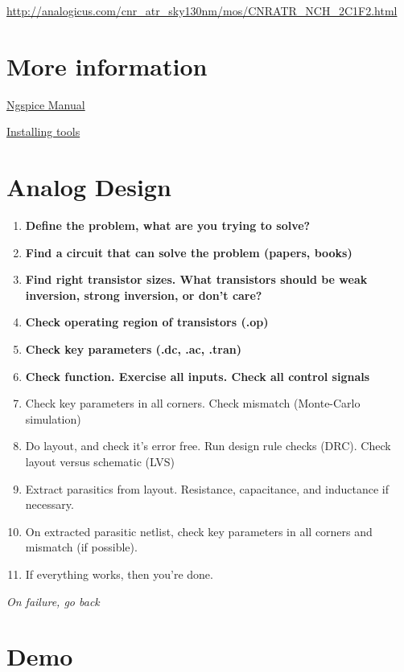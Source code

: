 \url{http://analogicus.com/cnr_atr_sky130nm/mos/CNRATR_NCH_2C1F2.html}

\section{More information}\label{more-information}

\href{http://ngspice.sourceforge.net/docs/ngspice-43-manual.pdf}{Ngspice
Manual}

\href{https://analogicus.com/aicex/started/}{Installing tools}

\section{Analog Design}\label{analog-design}

\begin{enumerate}
\def\labelenumi{\arabic{enumi}.}
\tightlist
\item
  \textbf{Define the problem, what are you trying to solve?}
\item
  \textbf{Find a circuit that can solve the problem (papers, books)}
\item
  \textbf{Find right transistor sizes. What transistors should be weak
  inversion, strong inversion, or don't care?}
\item
  \textbf{Check operating region of transistors (.op)}
\item
  \textbf{Check key parameters (.dc, .ac, .tran)}
\item
  \textbf{Check function. Exercise all inputs. Check all control
  signals}
\item
  Check key parameters in all corners. Check mismatch (Monte-Carlo
  simulation)
\item
  Do layout, and check it's error free. Run design rule checks (DRC).
  Check layout versus schematic (LVS)
\item
  Extract parasitics from layout. Resistance, capacitance, and
  inductance if necessary.
\item
  On extracted parasitic netlist, check key parameters in all corners
  and mismatch (if possible).
\item
  If everything works, then you're done.
\end{enumerate}

\emph{On failure, go back}

\section{Demo}\label{demo}


